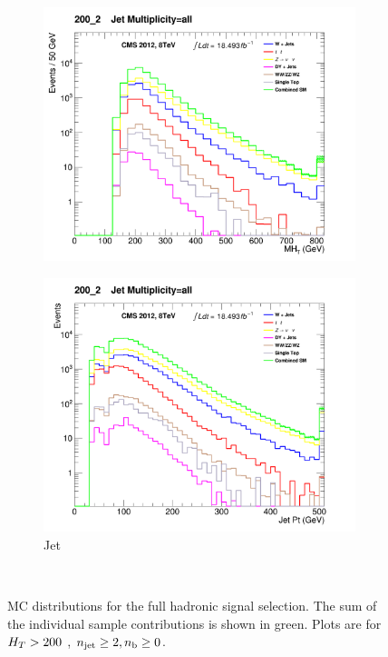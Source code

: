 \begin{figure}[!ht]
\begin{subfigure}[b]{0.48\textwidth}
      \caption{\HT}
    \end{subfigure} \\
    \begin{subfigure}[b]{0.48\textwidth}
      \includegraphics[width=\textwidth]{Figs/datamc/had/v1/MHT_all_200_upwards}
      \caption{\mht}
    \end{subfigure}
    \begin{subfigure}[b]{0.48\textwidth}
      \includegraphics[width=\textwidth]{Figs/datamc/had/v1/CommonJetPt_all_200_upwards}
      \caption{Jet \Pt}
    \end{subfigure} \\
    \caption{\label{fig:datamc_had_inc}
    MC distributions for the full hadronic signal selection. The 
    sum of the individual sample contributions is shown in green. Plots
    are for $H_T>200$ \gev, $n_{\text{jet}}\geq2, n_{\text{b}}\geq0$.
    }
\end{figure}
  
